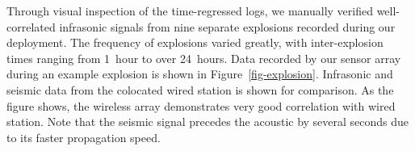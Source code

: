 Through visual inspection of the time-regressed logs, we manually
verified well-correlated infrasonic signals from nine separate explosions 
recorded during our deployment. The frequency of explosions varied
greatly, with inter-explosion times ranging from 1~hour to over 24~hours.
Data recorded by our sensor array during an example explosion is 
shown in Figure~\ref{fig-explosion}.
Infrasonic and seismic data from the colocated wired station is shown
for comparison. As the figure shows, the wireless array demonstrates
very good correlation with wired station.
Note that the seismic signal precedes the acoustic by
several seconds due to its faster propagation speed.

